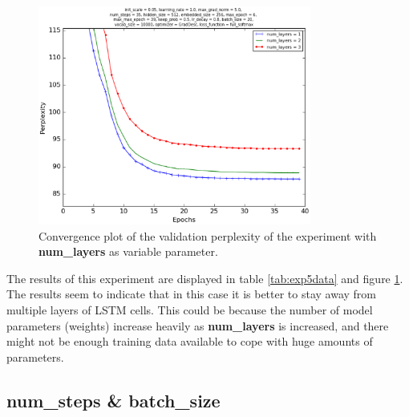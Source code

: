 \documentclass[10pt,a4paper,titlepage]{article}
\begin{document}
\begin{figure}[H]
	\begin{center}
		\includegraphics[width=0.80\textwidth]{Figures/numlayersperf.eps}
		\caption{Convergence plot of the validation perplexity of the experiment with \textbf{num\_layers} as variable parameter. }
		\label{fig:exp5perf}
	\end{center}	
\end{figure}

The results of this experiment are displayed in table \ref{tab:exp5data} and figure \ref{fig:exp5perf}. The results seem to indicate that in this case it is better to stay away from multiple layers of LSTM cells. This could be because the number of model parameters (weights) increase heavily as \textbf{num\_layers} is increased, and there might not be enough training data available to cope with huge amounts of parameters.

\newpage

\subsection{num\_steps \& batch\_size}
\end{document}
